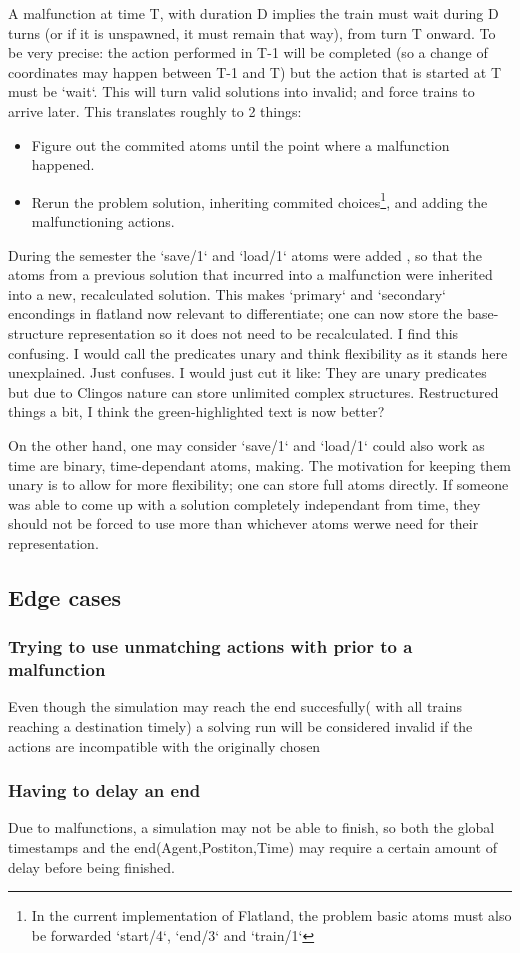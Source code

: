 A malfunction at time T, with duration D implies the train must wait during D turns (or if it is unspawned, it must remain that way), from turn T onward. To be very precise: the action performed in T-1 will be completed (so a change of coordinates may happen between T-1 and T) but the action that is started at T must be `wait`. This will turn valid solutions into invalid; and force trains to arrive later. This translates roughly to 2 things:
\begin{itemize}
	\item Figure out the commited atoms until the point where a malfunction happened.
	\item Rerun the problem solution, inheriting commited choices\footnote{In the current implementation of Flatland, the problem basic atoms must also be forwarded `start/4`, `end/3` and `train/1`}, and adding the malfunctioning actions.
\end{itemize}
During the semester the `save/1`  and `load/1` atoms were added \cite{malfunction_branch}, so that the atoms from a previous solution that incurred into a malfunction were inherited into a new, recalculated solution. \color{green} This makes `primary` and `secondary` encondings in flatland now relevant to differentiate; one can now store the base-structure representation so it does not need to be recalculated. \color{black} \color{gray} I find this confusing. I would call the predicates unary and think flexibility as it stands here unexplained. Just confuses. I would just cut it like: They are unary predicates but due to Clingos nature can store unlimited complex structures. 
\color{red} Restructured things a bit, I think the green-highlighted text is now better?

\color{black}

On the other hand, one may consider `save/1`  and `load/1` could also work as time are binary, time-dependant atoms, making. The motivation for keeping them unary is to allow for more flexibility; one can store full atoms directly. If someone was able to come up with a solution completely independant from time, they should not be forced to use more than whichever atoms werwe need for their representation.


\subsection{Edge cases}

\subsubsection {Trying to use unmatching actions with prior to a malfunction} Even though the simulation may reach the end succesfully( with all trains reaching a destination timely) a solving run will be considered invalid if the actions are incompatible with the originally chosen

\subsubsection {Having to delay an end} Due to malfunctions, a simulation may not be able to finish, so both the global timestamps and the end(Agent,Postiton,Time) may require a certain amount of delay before being finished.

